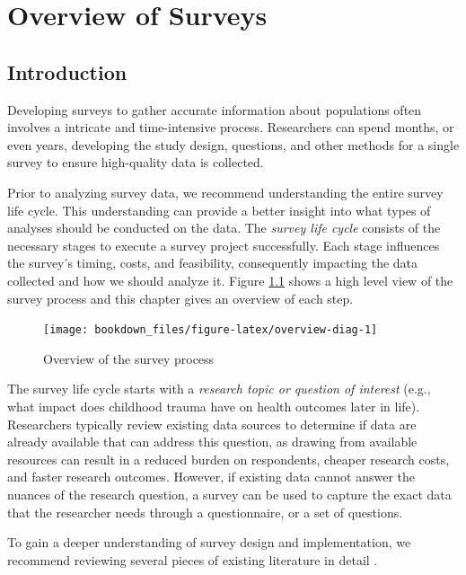 \documentclass[
]{krantz}
\begin{document}
\hypertarget{c02-overview-surveys}{%
\chapter{Overview of Surveys}\label{c02-overview-surveys}}

\hypertarget{introduction}{%
\section{Introduction}\label{introduction}}

Developing surveys to gather accurate information about populations often involves a intricate and time-intensive process. Researchers can spend months, or even years, developing the study design, questions, and other methods for a single survey to ensure high-quality data is collected.

Prior to analyzing survey data, we recommend understanding the entire survey life cycle. This understanding can provide a better insight into what types of analyses should be conducted on the data. The \emph{survey life cycle} consists of the necessary stages to execute a survey project successfully. Each stage influences the survey's timing, costs, and feasibility, consequently impacting the data collected and how we should analyze it. Figure \ref{fig:overview-diag} shows a high level view of the survey process and this chapter gives an overview of each step.

\begin{figure}
\texttt{[image: bookdown\_files/figure-latex/overview-diag-1]} \caption{Overview of the survey process}\label{fig:overview-diag}
\end{figure}

The survey life cycle starts with a \emph{research topic or question of interest} (e.g., what impact does childhood trauma have on health outcomes later in life). Researchers typically review existing data sources to determine if data are already available that can address this question, as drawing from available resources can result in a reduced burden on respondents, cheaper research costs, and faster research outcomes. However, if existing data cannot answer the nuances of the research question, a survey can be used to capture the exact data that the researcher needs through a questionnaire, or a set of questions.

To gain a deeper understanding of survey design and implementation, we recommend reviewing several pieces of existing literature in detail \citep[e.g.,][]{dillman2014mode, groves2009survey, Tourangeau2000psych, Bradburn2004, valliant2013practical, biemer2003survqual}.
\end{document}
